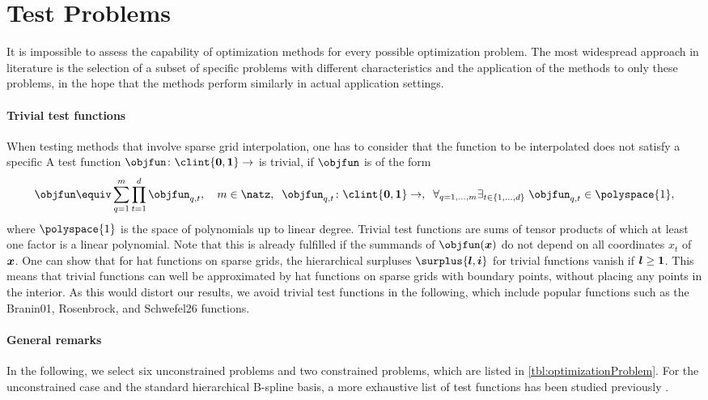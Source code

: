 \section{Test Problems}
\label{sec:52testProblems}

It is impossible to assess the capability of optimization methods
for every possible optimization problem.
The most widespread approach in literature
is the selection of a subset of specific problems
with different characteristics  and
the application of the methods to only these problems,
in the hope that the methods perform similarly in
actual application settings.

\paragraph{Trivial test functions}

When testing methods that involve sparse grid interpolation,
one has to consider that the function to be interpolated
does not satisfy a specific 
A test function $\objfun\colon \clint{\*0, \*1} \to \real$ is trivial, if
$\objfun$ is of the form
\begin{equation}
  \objfun \equiv \sum_{q=1}^m \prod_{t=1}^d \objfun_{q,t},\quad
  m \in \natz,\;\;
  \objfun_{q,t}\colon \clint{\*0, \*1} \to \real,\;\;
  \faex{q = 1, \dotsc, m}{t \in \{1, \dotsc, d\}}{
    \objfun_{q,t} \in \polyspace{1},
  }
\end{equation}
where $\polyspace{1}$ is the space of polynomials up to linear degree.
Trivial test functions are sums of tensor products of which at
least one factor is a linear polynomial.
Note that this is already fulfilled if the summands of $\objfun(\*x)$
do not depend on all coordinates $x_t$ of ${\boldsymbol{x}}$.
One can show that for hat functions on sparse grids,
the hierarchical surpluses $\surplus{\*l,\*i}$ for trivial functions
vanish if ${\boldsymbol{l}} \ge {\boldsymbol{1}}$.
This means that trivial functions can well be approximated by hat functions
on sparse grids with boundary points, without placing any points
in the interior.
As this would distort our results,
we avoid trivial test functions in the following,
which include popular functions such as the
Branin01, Rosenbrock, and Schwefel26 functions.

\paragraph{General remarks}

In the following, we select six unconstrained problems
and two constrained problems, which are listed in
\cref{tbl:optimizationProblem}.
For the unconstrained case and the standard hierarchical
B-spline basis, a more exhaustive list of test functions has been
studied previously \cite{Valentin14Hierarchische}.

